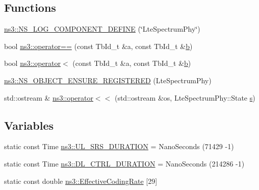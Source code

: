 \subsection*{Functions}
\begin{DoxyCompactItemize}
\item 
\hyperlink{namespacens3_a64f2a9ab6ae284861c20b98fa3647bb9}{ns3\+::\+N\+S\+\_\+\+L\+O\+G\+\_\+\+C\+O\+M\+P\+O\+N\+E\+N\+T\+\_\+\+D\+E\+F\+I\+NE} (\char`\"{}Lte\+Spectrum\+Phy\char`\"{})
\item 
bool \hyperlink{namespacens3_a5d2d4fd9c72c6e5f732c5db0a82e4869}{ns3\+::operator==} (const Tb\+Id\+\_\+t \&a, const Tb\+Id\+\_\+t \&\hyperlink{lte__pathloss_8m_a21ad0bd836b90d08f4cf640b4c298e7c}{b})
\item 
bool \hyperlink{namespacens3_a04a6db7edb4c014a0981fe65357dfca5}{ns3\+::operator$<$} (const Tb\+Id\+\_\+t \&a, const Tb\+Id\+\_\+t \&\hyperlink{lte__pathloss_8m_a21ad0bd836b90d08f4cf640b4c298e7c}{b})
\item 
\hyperlink{namespacens3_a0e0470b782777706f972bf23c369130c}{ns3\+::\+N\+S\+\_\+\+O\+B\+J\+E\+C\+T\+\_\+\+E\+N\+S\+U\+R\+E\+\_\+\+R\+E\+G\+I\+S\+T\+E\+R\+ED} (Lte\+Spectrum\+Phy)
\item 
std\+::ostream \& \hyperlink{namespacens3_a9e1f395ddb95f7a32ba8018bcade79f3}{ns3\+::operator$<$$<$} (std\+::ostream \&os, Lte\+Spectrum\+Phy\+::\+State \hyperlink{generate__test__data__lte__sinr_8m_ad83eeb3a142285d1243a08c6b7026df8}{s})
\end{DoxyCompactItemize}
\subsection*{Variables}
\begin{DoxyCompactItemize}
\item 
static const Time \hyperlink{namespacens3_af053019d8f8129f6aef84bf3a466ed40}{ns3\+::\+U\+L\+\_\+\+S\+R\+S\+\_\+\+D\+U\+R\+A\+T\+I\+ON} = Nano\+Seconds (71429 -\/1)
\item 
static const Time \hyperlink{namespacens3_a9f07caa6366012f773f086f0b8459e16}{ns3\+::\+D\+L\+\_\+\+C\+T\+R\+L\+\_\+\+D\+U\+R\+A\+T\+I\+ON} = Nano\+Seconds (214286 -\/1)
\item 
static const double \hyperlink{namespacens3_af70af4887722b3badf3d57ca573d9502}{ns3\+::\+Effective\+Coding\+Rate} \mbox{[}29\mbox{]}
\end{DoxyCompactItemize}

